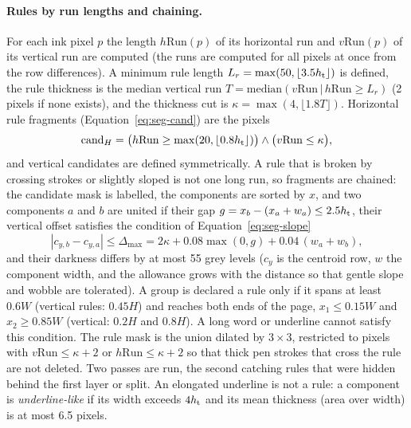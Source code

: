 \paragraph{Rules by run lengths and chaining.}
For each ink pixel $p$ the length $h\mathrm{Run}(p)$ of its horizontal run and $v\mathrm{Run}(p)$ of its vertical run are computed (the runs are computed for all pixels at once from the row differences).
A minimum rule length $L_r=\max(50,\lfloor3.5h_{\mathrm{t}}\rfloor)$ is defined, the rule thickness is the median vertical run $T=\mathrm{median}(v\mathrm{Run}\,|\,h\mathrm{Run}\ge L_r)$ (2 pixels if none exists), and the thickness cut is $\kappa=\max(4,\lfloor1.8T\rfloor)$.
Horizontal rule fragments (Equation~\ref{eq:seg-cand}) are the pixels
\begin{equation}
\mathrm{cand}_H=\bigl(h\mathrm{Run}\ge\max(20,\lfloor0.8h_{\mathrm{t}}\rfloor)\bigr)\wedge\bigl(v\mathrm{Run}\le\kappa\bigr),
\label{eq:seg-cand}
\end{equation}
and vertical candidates are defined symmetrically.
A rule that is broken by crossing strokes or slightly sloped is not one long run, so fragments are chained: the candidate mask is labelled, the components are sorted by $x$, and two components $a$ and $b$ are united if their gap $g=x_b-(x_a+w_a)\le2.5h_{\mathrm{t}}$, their vertical offset satisfies the condition of Equation~\ref{eq:seg-slope}
\begin{equation}
|c_{y,b}-c_{y,a}|\le\Delta_{\max}=2\kappa+0.08\max(0,g)+0.04\,(w_a+w_b),
\label{eq:seg-slope}
\end{equation}
and their darkness differs by at most 55 grey levels ($c_y$ is the centroid row, $w$ the component width, and the allowance grows with the distance so that gentle slope and wobble are tolerated).
A group is declared a rule only if it spans at least $0.6W$ (vertical rules: $0.45H$) and reaches both ends of the page, $x_1\le0.15W$ and $x_2\ge0.85W$ (vertical: $0.2H$ and $0.8H$).
A long word or underline cannot satisfy this condition.
The rule mask is the union dilated by $3\times3$, restricted to pixels with $v\mathrm{Run}\le\kappa+2$ or $h\mathrm{Run}\le\kappa+2$ so that thick pen strokes that cross the rule are not deleted.
Two passes are run, the second catching rules that were hidden behind the first layer or split.
An elongated underline is not a rule: a component is \emph{underline-like} if its width exceeds $4h_{\mathrm{t}}$ and its mean thickness (area over width) is at most 6.5 pixels.

